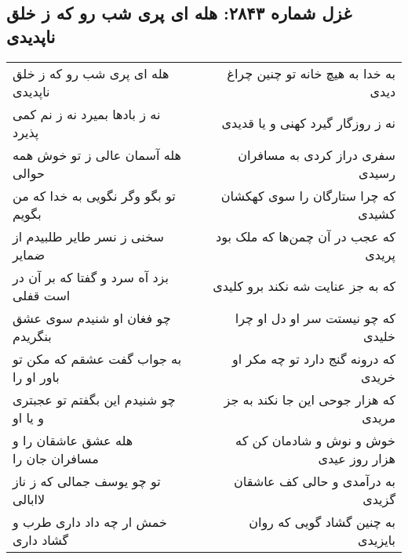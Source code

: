\begin{center}
\section*{غزل شماره ۲۸۴۳: هله ای پری شب رو که ز خلق ناپدیدی}
\label{sec:2843}
\begin{longtable}{l p{0.5cm} r}
هله ای پری شب رو که ز خلق ناپدیدی
&&
به خدا به هیچ خانه تو چنین چراغ دیدی
\\
نه ز بادها بمیرد نه ز نم کمی پذیرد
&&
نه ز روزگار گیرد کهنی و یا قدیدی
\\
هله آسمان عالی ز تو خوش همه حوالی
&&
سفری دراز کردی به مسافران رسیدی
\\
تو بگو وگر نگویی به خدا که من بگویم
&&
که چرا ستارگان را سوی کهکشان کشیدی
\\
سخنی ز نسر طایر طلبیدم از ضمایر
&&
که عجب در آن چمن‌ها که ملک بود پریدی
\\
بزد آه سرد و گفتا که بر آن در است قفلی
&&
که به جز عنایت شه نکند برو کلیدی
\\
چو فغان او شنیدم سوی عشق بنگریدم
&&
که چو نیستت سر او دل او چرا خلیدی
\\
به جواب گفت عشقم که مکن تو باور او را
&&
که درونه گنج دارد تو چه مکر او خریدی
\\
چو شنیدم این بگفتم تو عجبتری و یا او
&&
که هزار جوحی این جا نکند به جز مریدی
\\
هله عشق عاشقان را و مسافران جان را
&&
خوش و نوش و شادمان کن که هزار روز عیدی
\\
تو چو یوسف جمالی که ز ناز لاابالی
&&
به درآمدی و حالی کف عاشقان گزیدی
\\
خمش ار چه داد داری طرب و گشاد داری
&&
به چنین گشاد گویی که روان بایزیدی
\\
\end{longtable}
\end{center}
